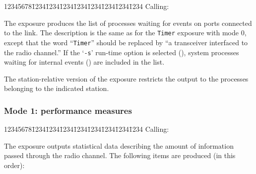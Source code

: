 {\tt\begin{tabbing}
12345678\=1234\=1234\=1234\=1234\=1234\=1234\=1234\=1234\kill
{\rm Calling:}
\end{tabbing}}

The exposure produces the
list of processes waiting for events on ports connected to the link.
The description is the same as for the {\tt Timer} exposure
with mode 0, except that the word ``{\tt Timer}'' should be replaced by
``a transceiver interfaced to the radio channel.''
If the `{\tt -s}' run-time option is selected
(), system
processes waiting for internal events
() are included in the list.

The station-relative version of the exposure restricts the output to
the processes belonging to the indicated station.

\subsubsection*{Mode 1: performance measures}

{\tt\begin{tabbing}
12345678\=1234\=1234\=1234\=1234\=1234\=1234\=1234\=1234\kill
{\rm Calling:}
\end{tabbing}}

The exposure outputs statistical data describing the amount of
information passed through the radio channel.
The following items are produced (in this order):

